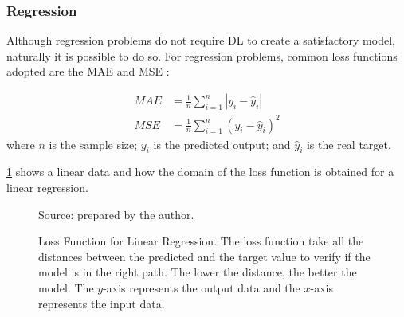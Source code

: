 \subsubsection*{Regression}

Although regression problems do not require DL to create a satisfactory model, naturally it is possible to do so.
For regression problems, common loss functions adopted are the MAE and MSE \cite{bussab2017}:

\begin{align}
    MAE &= \frac{1}{n} \sum_{i=1}^n |y_i - \hat{y}_i| 
    \label{eq:mae} \\
    MSE&= \frac{1}{n} \sum_{i=1}^n (y_i - \hat{y}_i)^2
    \label{eq:mse}
\end{align}
%
where \(n\) is the sample size; \(y_i\) is the predicted output; and \(\hat{y}_i\) is the real target.

\cref{fig:mae_chart} shows a linear data and how the domain of the loss function is obtained for a linear regression.
%
\begin{figure}[!htb]
    \centering
    \caption[Loss Function for Linear Regression]{Loss Function for Linear Regression. The loss function take all the distances between the predicted and the target value to verify if the model is in the right path. The lower the distance, the better the model. The \(y\)-axis represents the output data and the \(x\)-axis represents the input data.}
    
    
    {\footnotesize Source: prepared by the author.}
    \label{fig:mae_chart}
\end{figure}



